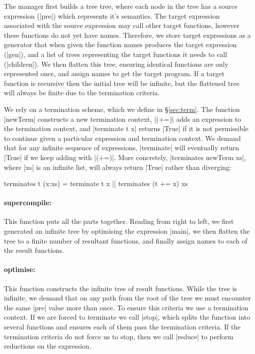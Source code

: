 \documentclass{sigplanconf}
\begin{document}
The manager first builds a tree tree, where each node in the tree has a source expression (|pre|) which represents it's semantics. The target expression associated with the source expression may call other target functions, however these functions do not yet have names. Therefore, we store target expressions as a generator that when given the function names produces the target expression (|gen|), and a list of trees representing the target functions it needs to call (|children|). We then flatten this tree, ensuring identical functions are only represented once, and assign names to get the target program. If a target function is recursive then the initial tree will be infinite, but the flattened tree will always be finite due to the termination criteria.

We rely on a termination scheme, which we define in \S\ref{sec:term}. The function |newTerm| constructs a new termination context, |(+=)| adds an expression to the termination context, and |terminate t x| returns |True| if it is not permissible to continue given a particular expression and termination context. We demand that for any infinite sequence of expressions, |terminate| will eventually return |True| if we keep adding with |(+=)|. More concretely, |terminates newTerm xs|, where |xs| is an infinite list, will always return |True| rather than diverging:

\begin{code}
terminates t (x:xs) = terminate t x || terminates (t += x) xs
\end{code}

\newcommand{\function}[1]{\paragraph{\textsf{#1:}}\hspace{-3mm}}

\function{supercompile} This function puts all the parts together. Reading from right to left, we first generated an infinite tree by optimising the expression |main|, we then flatten the tree to a finite number of resultant functions, and finally assign names to each of the result functions.

\function{optimise} This function constructs the infinite tree of result functions. While the tree is infinite, we demand that on any path from the root of the tree we must encounter the same |pre| value more than once. To ensure this criteria we use a termination context. If we are forced to terminate we call |stop|, which splits the function into several functions and ensures each of them pass the termination criteria. If the termination criteria do not force us to stop, then we call |reduce| to perform reductions on the expression.
\end{document}
